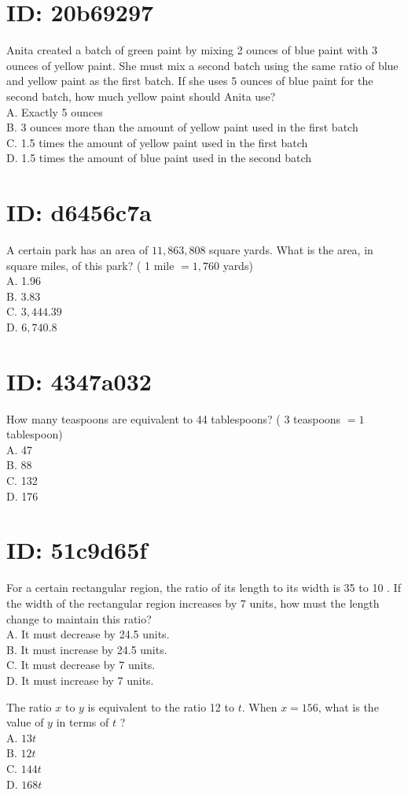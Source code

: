 \section*{ID: 20b69297}
Anita created a batch of green paint by mixing 2 ounces of blue paint with 3 ounces of yellow paint. She must mix a second batch using the same ratio of blue and yellow paint as the first batch. If she uses 5 ounces of blue paint for the second batch, how much yellow paint should Anita use?\\
A. Exactly 5 ounces\\
B. 3 ounces more than the amount of yellow paint used in the first batch\\
C. 1.5 times the amount of yellow paint used in the first batch\\
D. 1.5 times the amount of blue paint used in the second batch

\section*{ID: d6456c7a}
A certain park has an area of $11,863,808$ square yards. What is the area, in square miles, of this park? ( 1 mile $=1,760$ yards)\\
A. 1.96\\
B. 3.83\\
C. $3,444.39$\\
D. $6,740.8$

\section*{ID: 4347a032}
How many teaspoons are equivalent to 44 tablespoons? ( 3 teaspoons $=1$ tablespoon)\\
A. 47\\
B. 88\\
C. 132\\
D. 176

\section*{ID: 51c9d65f}
For a certain rectangular region, the ratio of its length to its width is 35 to 10 . If the width of the rectangular region increases by 7 units, how must the length change to maintain this ratio?\\
A. It must decrease by 24.5 units.\\
B. It must increase by 24.5 units.\\
C. It must decrease by 7 units.\\
D. It must increase by 7 units.

The ratio $x$ to $y$ is equivalent to the ratio 12 to $t$. When $x=156$, what is the value of $y$ in terms of $t$ ?\\
A. $13 t$\\
B. $12 t$\\
C. $144 t$\\
D. $168 t$


